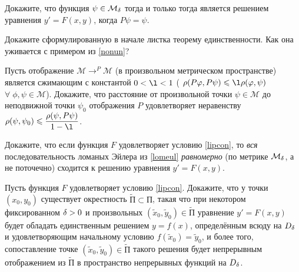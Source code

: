 \documentclass[a4paper, 12pt]{article}
\newcommand{\cM}{\ensuremath{\mathcal M}}
\begin{document}
  Докажите, что функция $\psi\in\cM_\de$ тогда и только
  тогда является решением уравнения $y'=F(x,y)$, когда $P\psi=\psi$.





  Докажите сформулированную в начале листка теорему единственности.
  Как она уживается с примером из \ref{nonun}?





  Пусть отображение $\cM\to^P\cM$ (в произвольном метрическом
  пространстве) является сжимающим с константой $0<\l<1$ (
  $\rho(P\phi,P\psi)\le\l\rho(\phi,\psi)$ $\forall\;\phi,\psi\in\cM$). Докажите,
  что расстояние от произвольной точки $\psi\in\cM$ до неподвижной
  точки $\psi_0$ отображения $P$ удовлетворяет неравенству
  $\rho(\psi,\psi_0)\le\dfrac{\rho(\psi,P\psi)}{1-\l}$.





  Докажите, что если функция $F$ удовлетворяет условию \eqref{lipcon},
  то {\it вся\/} последовательность ломаных Эйлера из \ref{lomeul}
  {\it равномерно\/} ( по метрике $\cM_\de$, а не поточечно) сходится
  к решению уравнения $y'=F(x,y)$.





  Пусть функция $F$ удовлетворяет условию \eqref{lipcon}. Докажите, что
  у точки $(x_0,y_0)$ существует окрестность $\widetilde П\subset П$, такая
  что при некотором фиксированном $\delta>0$ и произвольных $(\widetilde x_0,\widetilde
  y_0)\in\widetilde П$ уравнение $y'=F(x,y)$ будет обладать единственным
  решением $y=f(x)$, определённым всюду на $D_\delta$ и удовлетворяющим
  начальному условию $f(\widetilde x_0)=\widetilde y_0$, и более того,
  сопоставление точке $(\widetilde x_0,\widetilde y_0)\in\widetilde П$ такого решения
  будет непрерывным отображением из $\widetilde П$ в пространство непрерывных
  функций на $D_\delta$.


\end{document}
